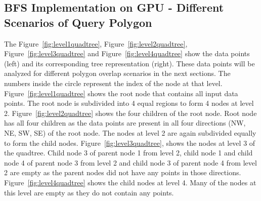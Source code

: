 \subsection{BFS Implementation on GPU - Different Scenarios of Query Polygon}

The Figure~\ref{fig:level1quadtree}, Figure~\ref{fig:level2quadtree}, Figure~\ref{fig:level3quadtree} and Figure~\ref{fig:level4quadtree} show the data points (left)  and its corresponding tree representation (right). These data points will be analyzed for different polygon overlap scenarios in the next sections.
The numbers inside the circle represent the index of the node at that level.
Figure~\ref{fig:level1quadtree} shows the root node that contains all input data points. The root node is subdivided into 4 equal regions to form 4 nodes at level 2.
Figure~\ref{fig:level2quadtree} shows the four children of the root node. Root node has all four children as the data points are present in all four directions (NW, NE, SW, SE) of the root node. The nodes at level 2 are again subdivided equally to form the child nodes.
Figure~\ref{fig:level3quadtree}, shows the nodes at level 3 of the quadtree. Child node 3 of parent node 1 from level 2, child node 1 and child node 4 of parent node 3 from level 2 and child node 3 of parent node 4 from level 2 are empty as the parent nodes did not have any points in those directions.
Figure~\ref{fig:level4quadtree} shows the child nodes at level 4. Many of the nodes at this level are empty as they do not contain any points.


